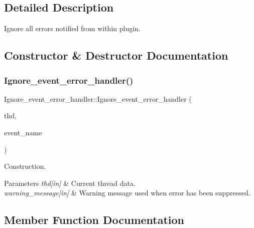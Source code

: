 \subsection{Detailed Description}
Ignore all errors notified from within plugin. 

\subsection{Constructor \& Destructor Documentation}
\mbox{\label{classIgnore__event__error__handler_a7eb15f1543e2afbf533f8c9b527a7f07}} 
\subsubsection{\texorpdfstring{Ignore\+\_\+event\+\_\+error\+\_\+handler()}{Ignore\_event\_error\_handler()}}
{\footnotesize\ttfamily Ignore\+\_\+event\+\_\+error\+\_\+handler\+::\+Ignore\+\_\+event\+\_\+error\+\_\+handler (\begin{DoxyParamCaption}\item[{T\+HD $\ast$}]{thd,  }\item[{const char $\ast$}]{event\+\_\+name }\end{DoxyParamCaption})\hspace{0.3cm}{\ttfamily [inline]}}



Construction. 


\begin{DoxyParams}{Parameters}
{\em thd\mbox{[}in\mbox{]}} & Current thread data. \\
\hline
{\em warning\+\_\+message\mbox{[}in\mbox{]}} & Warning message used when error has been suppressed. \\
\hline
\end{DoxyParams}


\subsection{Member Function Documentation}
\mbox{\label{classIgnore__event__error__handler_a0ade890f86d2a321f78f90ed446328a6}} 
